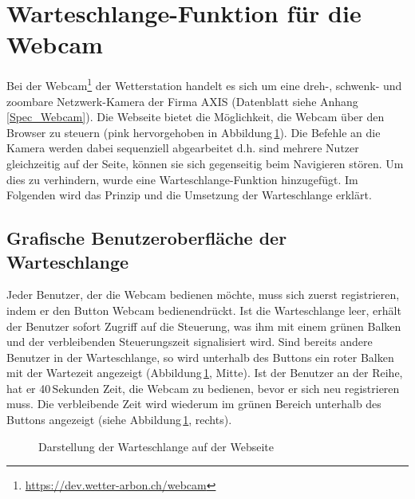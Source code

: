 \section{Warteschlange-Funktion für die Webcam}
Bei der Webcam\footnote{\url{https://dev.wetter-arbon.ch/webcam}} der Wetterstation handelt es sich um eine dreh-, schwenk- und zoombare Netzwerk-Kamera der Firma AXIS (Datenblatt siehe Anhang\,\ref{Spec_Webcam}). Die Webseite bietet die Möglichkeit, die Webcam über den Browser zu steuern (pink hervorgehoben in Abbildung\,\ref{img:warteschlange}). Die Befehle an die Kamera werden dabei sequenziell abgearbeitet d.h. sind mehrere Nutzer gleichzeitig auf der Seite, können sie sich gegenseitig beim Navigieren stören. Um dies zu verhindern, wurde eine Warteschlange-Funktion hinzugefügt. Im Folgenden wird das Prinzip und die Umsetzung der Warteschlange erklärt.

\subsection{Grafische Benutzeroberfläche der Warteschlange}
Jeder Benutzer, der die Webcam bedienen möchte, muss sich zuerst registrieren, indem er den Button \flqq Webcam bedienen\frqq  drückt. Ist die Warteschlange leer, erhält der Benutzer sofort Zugriff auf die Steuerung, was ihm mit einem grünen Balken und der verbleibenden Steuerungszeit signalisiert wird. Sind bereits andere Benutzer in der Warteschlange, so wird unterhalb des Buttons ein roter Balken mit der Wartezeit angezeigt (Abbildung\,\ref{img:warteschlange}, Mitte). Ist der Benutzer an der Reihe, hat er 40\,Sekunden Zeit, die Webcam zu bedienen, bevor er sich neu registrieren muss. Die verbleibende Zeit wird wiederum im grünen Bereich unterhalb des Buttons angezeigt (siehe Abbildung\,\ref{img:warteschlange}, rechts).


\begin{figure}[htbp!]
	\centering
	\caption{Darstellung der Warteschlange auf der Webseite}
	\label{img:warteschlange}
\end{figure}



